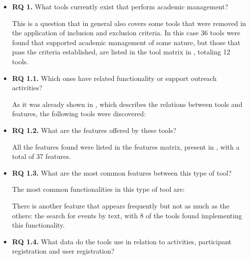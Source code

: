 \begin{itemize}
  \item \textbf{RQ 1.} What tools currently exist that perform academic management?

        This is a question that in general also covers some tools that were removed in the application of inclusion and exclusion criteria. In this case 36 tools were found that supported academic management of some nature, but those that pass the criteria established, are listed in the tool matrix in , totaling 12 tools.
  \item \textbf{RQ 1.1.} Which ones have related functionality or support outreach activities?

        As it was already shown in , which describes the relations between tools and features, the following tools were discovered:

  \item \textbf{RQ 1.2.} What are the features offered by these tools?

        All the features found were listed in the features matrix, present in , with a total of 37 features.
  \item \textbf{RQ 1.3.} What are the most common features between this type of tool?

        The most common functionalities in this type of tool are:
        There is another feature that appears frequently but not as much as the others: the search for events by text, with 8 of the tools found implementing this functionality.
  \item \textbf{RQ 1.4.} What data do the tools use in relation to activities, participant registration and user registration?


\end{itemize}
